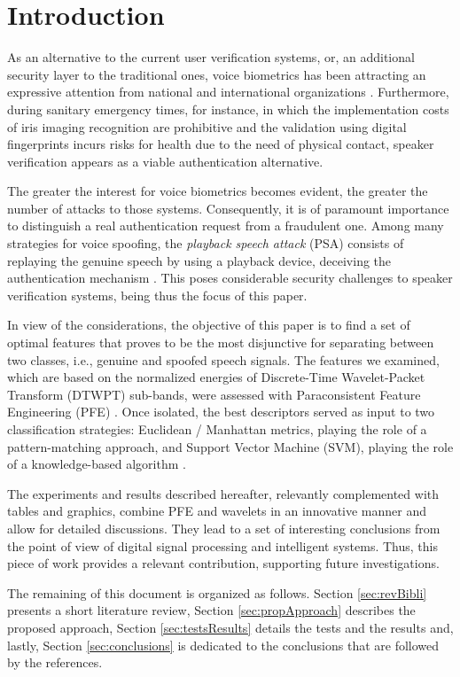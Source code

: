 \section{Introduction}
\label{introduction}
\par As an alternative to the current user verification systems, or, an additional security layer to the traditional ones, voice biometrics has been attracting an expressive attention from national and international organizations \cite{vs1}. Furthermore, during sanitary emergency times, for instance, in which the implementation costs of iris imaging recognition are prohibitive and the validation using digital fingerprints incurs risks for health due to the need of physical contact, speaker verification appears as a viable authentication alternative.
\\				
\par The greater the interest for voice biometrics becomes evident, the greater the number of attacks to those systems. Consequently, it is of paramount importance to distinguish a real authentication request from a fraudulent one. Among many strategies for voice spoofing, the \textit{playback speech attack} (PSA) consists of replaying the genuine speech by using a playback device, deceiving the authentication mechanism \cite{vs2}. This poses considerable security challenges to speaker verification systems, being thus the focus of this paper. 
\\
\par In view of the considerations, the objective of this paper is to find a set of optimal features that proves to be the most disjunctive for separating between two classes, i.e., genuine and spoofed speech signals. The features we examined, which are based on the normalized energies of Discrete-Time Wavelet-Packet Transform (DTWPT) \cite{dwt1} sub-bands, were assessed with Paraconsistent Feature Engineering (PFE) \cite{8588433}. Once isolated, the best descriptors served as input to two classification strategies: Euclidean / Manhattan metrics, playing the role of a pattern-matching approach, and Support Vector Machine (SVM), playing the role of a knowledge-based algorithm \cite{bishop:2006:PRML}.
\\
\par The experiments and results described hereafter, relevantly complemented with tables and graphics, combine PFE and wavelets in an innovative manner and allow for detailed discussions. They lead to a set of interesting conclusions from the point of view of digital signal processing and intelligent systems. Thus, this piece of work provides a relevant contribution, supporting future investigations. 
\\
\par The remaining of this document is organized as follows. Section \ref{sec:revBibli} presents a short literature review, Section \ref{sec:propApproach} describes the proposed approach, Section \ref{sec:testsResults} details the tests and the results and, lastly, Section \ref{sec:conclusions} is dedicated to the conclusions that are followed by the references. 